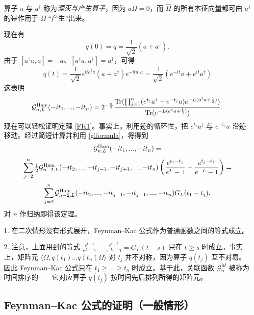 \begin{remark} 算子 $a$ 与 $a^\dagger$ 称为\emph{湮灭与产生算子}，因为 $a\Omega=0$，而 $\widehat H$ 的所有本征向量都可由 $a^\dagger$ 的幂作用于 $\Omega$ “产生”出来。
\end{remark} 

现在有
$$
q(0)=q=\frac{1}{\sqrt{2}}(a+a^\dagger).
$$
由于 $[a^\dagger a,a]=-a$、$[a^\dagger a,a^\dagger]=a^\dagger$，可得
$$
q(t) =\frac{1}{\sqrt{2}}e^{ita^\dagger a}(a+a^\dagger)
e^{-ita^\dagger a}=
\frac{1}{\sqrt{2}}(e^{-it}a+e^{it}a^\dagger)
$$
这表明
$$
\mathcal{G}_{n,L}^{\rm Ham}(-it_1,...,-it_n)=2^{-\frac{n}{2}}\frac{\text{Tr}(\prod_{j=1}^n
(e^{t_j}a^\dagger+e^{-t_j}a)e^{-L(a^\dagger a+\frac{1}{2})})}
{\text{Tr}(e^{-L(a^\dagger a+\frac{1}{2})})}.
$$
现在可以轻松证明定理 \ref{FK1}。事实上，利用迹的循环性，把 $e^{t_1}a^\dagger$ 与 $e^{-t_1}a$ 沿迹移动。经过简短计算并利用 \eqref{glformula}，将得到
$$
\mathcal{G}_{n,L}^{\rm Ham}(-it_1,...,-it_n)=
$$
$$
\sum_{j=2}^n \tfrac{1}{2}\mathcal{G}_{n-2,L}^{\rm Ham}(-it_2,...,-it_{j-1},-it_{j+1},...,-it_n)
\left(\frac{e^{t_1-t_j}}{e^L-1}-\frac{e^{t_j-t_1}}{e^{-L}-1}\right)=
$$
$$
\sum_{j=2}^n \mathcal{G}_{n-2,L}^{\rm Ham}(-it_2,...,-it_{j-1},-it_{j+1},...,-it_n)G_L(t_1-t_j).
$$
对 $n$ 作归纳即得该定理。

\begin{remark} 1. 在二次情形没有形式展开，Feynman–Kac 公式作为普通函数之间的等式成立。

2. 注意，上面用到的等式 $\frac{e^{t-s}}{e^L-1}-\frac{e^{s-t}}{e^{-L}-1}=G_L(t-s)$ 只在 $t\ge s$ 时成立。事实上，矩阵元 $\langle\Omega, q(t_1)...q(t_n)\Omega\rangle$ 对 $t_j$ 并不对称，因为算子 $q(t_j)$ 互不对易。因此 Feynman–Kac 公式只在 $t_1\ge...\ge t_n$ 时成立。基于此，关联函数 $\mathcal G_{n}^M$ 被称为时间排序的——它对应算子 $q(t_j)$ 按时间先后排列所得的矩阵元。
\end{remark} 


\subsection{Feynman–Kac 公式的证明（一般情形）}


